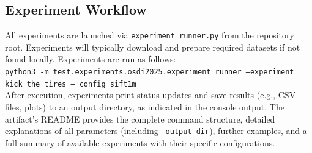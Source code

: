 \subsection{Experiment Workflow}
All experiments are launched via \texttt{experiment\_runner.py} from the repository root. Experiments will typically download and prepare required datasets if not found locally. Experiments are run as follows: \\
\texttt{python3 -m test.experiments.osdi2025.experiment\_runner --experiment kick\_the\_tires -- config sift1m} \\
After execution, experiments print status updates and save results (e.g., CSV files, plots) to an output directory, as indicated in the console output. The artifact's README provides the complete command structure, detailed explanations of all parameters (including \texttt{--output-dir}), further examples, and a full summary of available experiments with their specific configurations.